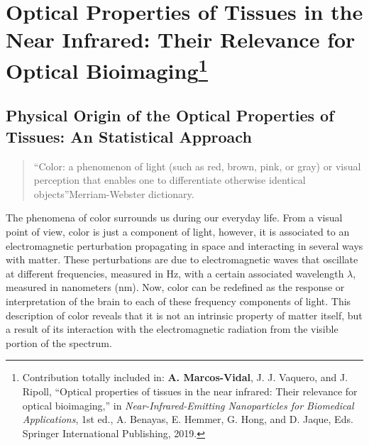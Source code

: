 \chapter[Optical Properties of Tissues in the Near Infrared: Their Relevance for Optical Bioimaging]{Optical 
Properties of Tissues in the Near Infrared: Their Relevance for Optical Bioimaging\footnote{Contribution totally included in: \textbf{A. Marcos-Vidal}, J. J. Vaquero, and J. Ripoll, “Optical properties of tissues in the near infrared: Their relevance for optical bioimaging,” in \textit{Near-Infrared-Emitting Nanoparticles for Biomedical Applications}, 1st ed., A. Benayas, E. Hemmer, G. Hong, and D. Jaque, Eds. Springer International Publishing, 2019.}}
\label{chap:theory}


\section{Physical Origin of the Optical Properties of Tissues: An Statistical Approach}
\label{sec:1}
\begin{quotation}
``Color: a phenomenon of light (such as red, brown, pink, or gray) or visual perception that enables one to differentiate otherwise identical objects''\textemdash Merriam-Webster dictionary.
\end{quotation}

The phenomena of color surrounds us during our everyday life. From a visual point of view, color is just a component of light, however, it is associated to an electromagnetic perturbation propagating in space and interacting in several ways with matter. These perturbations are due to electromagnetic waves that oscillate at different frequencies, measured in \si{\hertz}, with a certain associated wavelength $\lambda$, measured in nanometers (\si{\nm}). Now, color can be redefined as the response or interpretation of the brain to each of these frequency components of light. This description of color reveals that it is not an intrinsic property of matter itself, but a result of its interaction with the electromagnetic radiation from the visible portion of the spectrum. 

